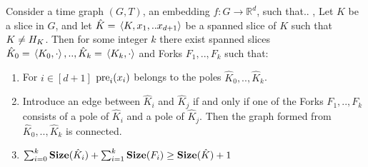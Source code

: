   \begin{claim}
    \label{claim:prevslices}
    Consider a time graph $(G,T)$, an embedding $f \colon G \rightarrow \mathbb{R}^{d}$, such that.. , Let $K$ be a slice in $G$, and let $\hat{K} = \expval*{K, x_{1}, .. x_{d+1}}$ be a spanned slice of $K$ such that $K \neq H_{K}$. Then for some integer $k$ there exist spanned slices $\hat{K}_{0} = \expval*{K_{0}, \cdot}, ..,\hat{K}_{k}=\expval*{K_{k}, \cdot }$ and Forks $F_{1},..,F_{k}$ such that:
    \begin{enumerate}
      \item For $i \in [d+1]$ $ \text{pre}_{i}(x_{i}) $ belongs to the poles $\hat{K}_{0},..,\hat{K}_{k}$.  
      \item Introduce an edge between $\hat{K}_{i}$ and $\hat{K}_{j}$ if and only if one of the Forks $F_{1},..,F_{k}$ consists of a pole of $\hat{K}_{i}$ and a pole of $\hat{K}_{j}$. Then the graph formed from $\hat{K}_{0},..,\hat{K}_{k}$ is connected.  
      \item $\sum_{i=0}^{k}\mathbf{Size}(\hat{K}_{i}) +  \sum^{k}_{i=1}\mathbf{Size}(F_{i}) \ge \mathbf{Size}(\hat{K}) + 1 $
    \end{enumerate}
  \end{claim}
